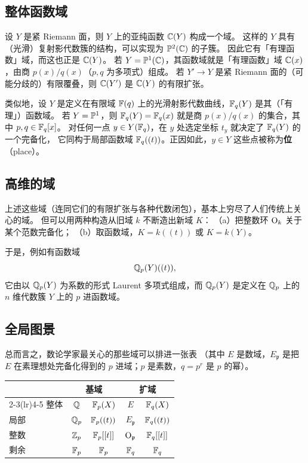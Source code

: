 \subsection{整体函数域}

设 $Y$ 是紧 Riemann 面，则 $Y$ 上的亚纯函数 $\mathbb{C}(Y)$ 构成一个域。
这样的 $Y$ 具有（光滑）复射影代数簇的结构，可以实现为 $\mathbb{P}^2(\mathbb{C})$ 的子簇。
因此它有「有理函数」域，而这也正是 $\mathbb{C}(Y)$。
若 $Y=\mathbb{P}^1(\mathbb{C})$，其函数域就是「有理函数」域 $\mathbb{C}(x)$，由商 $p(x)/q(x)$（$p,q$ 为多项式）组成。
若 $Y'\to Y$ 是紧 Riemann 面的（可能分歧的）有限覆叠，则 $\mathbb{C}(Y')$ 是 $\mathbb{C}(Y)$ 的有限扩张。

类似地，设 $Y$ 是定义在有限域 $\mathbb{F}(q)$ 上的光滑射影代数曲线，$\mathbb{F}_q(Y)$ 是其（「有理」）函数域。
若 $Y=\mathbb{P}^1$，则 $\mathbb{F}_q(Y)=\mathbb{F}_q(x)$ 就是商 $p(x)/q(x)$ 的集合，其中 $p,q\in\mathbb{F}_q[x]$。
对任何一点 $y\in Y(\mathbb{F}_q)$，在 $y$ 处选定坐标 $t_y$ 就决定了 $\mathbb{F}_q(Y)$ 的一个完备化，
它同构于局部函数域 $\mathbb{F}_q((t))$。正因如此，$y\in Y$ 这些点被称为\textbf{位}（place）。

\subsection{高维的域}

上述这些域（连同它们的有限扩张与各种代数闭包），基本上穷尽了人们传统上关心的域。
但可以用两种构造从旧域 $k$ 不断造出新域 $K$：
（a）把整数环 $\mathrm{O}_k$ 关于某个范数完备化；
（b）取函数域，$K=k((t))$ 或 $K=k(Y)$。

于是，例如有函数域
\[
\mathbb{Q}_p(Y)((t)),
\]
它由以 $\mathbb{Q}_p(Y)$ 为系数的形式 Laurent 多项式组成，而 $\mathbb{Q}_p(Y)$ 是定义在 $\mathbb{Q}_p$ 上的 $n$ 维代数簇 $Y$ 上的 $p$ 进函数域。

\subsection{全局图景}

总而言之，数论学家最关心的那些域可以排进一张表
（其中 $E$ 是数域，$E_{\mathfrak p}$ 是把 $E$ 在素理想处完备化得到的 $p$ 进域；$p$ 是素数，$q=p^r$ 是 $p$ 的幂）。

\begin{center}
\renewcommand{\arraystretch}{1.35}
\begin{tabular}{@{}lcccc@{}}
\toprule
& \multicolumn{2}{c}{基域} & \multicolumn{2}{c}{扩域} \\
\cmidrule(lr){2-3}\cmidrule(lr){4-5}
整体 & $\mathbb{Q}$ & $\mathbb{F}_p(X)$ & $E$ & $\mathbb{F}_q(X)$ \\
局部 & $\mathbb{Q}_p$ & $\mathbb{F}_p((t))$ & $E_{\mathfrak p}$ & $\mathbb{F}_q((t))$ \\
整数 & $\mathbb{Z}_p$ & $\mathbb{F}_p[[t]]$ & $\mathrm{O}_{\mathfrak p}$ & $\mathbb{F}_q[[t]]$ \\
剩余 & $\mathbb{F}_p$ & $\mathbb{F}_p$ & $\mathbb{F}_q$ & $\mathbb{F}_q$ \\
\bottomrule
\end{tabular}
\end{center}

